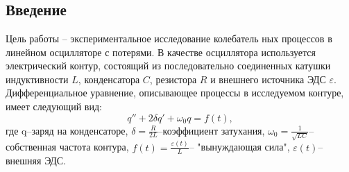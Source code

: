 
\usepackage{setspace}



\def\labauthors{Понур К.А., Сарафанов Ф.Г., Сидоров Д.А.}
\def\labgroup{420}
\def\labnumber{217}
\def\labtheme{Исследование колебательных процессов в электрическом контуре}
\renewcommand{\vec}{\mathbf}
\renewcommand{\Re}{\operatorname{Re}}
\renewcommand{\Im}{\operatorname{Im}}
\renewcommand{\phi}{\varphi}
\renewcommand{\kappa}{\varkappa}
\renewcommand{\hat}{\widehat}

\begin{spacing}{1.2}
\tableofcontents
\end{spacing}
\newpage


\section{}
\subsection{Введение}
Цель работы -- экспериментальное исследование колебатель
ных процессов в линейном осцилляторе с потерями. В качестве осциллятора используется электрический
контур, состоящий из последовательно соединенных
катушки индуктивности $L$,
конденсатора $C$, резистора $R$
и внешнего источника ЭДС $\varepsilon$.
Дифференциальное уравнение, описывающее процессы в исследуемом контуре, имеет следующий вид:
\begin{equation}
	q''+2\delta q'+\omega_0 q=f(t),
\end{equation}
где q--заряд на конденсаторе, $\delta=\frac{R}{2L}$--коэффициент затухания, $\omega_0=\frac{1}{\sqrt{LC}}$--собственная частота контура, $f(t)=\frac{\varepsilon(t)}{L}$-- "вынуждающая сила", $\varepsilon(t)$-- внешняя ЭДС.
 


